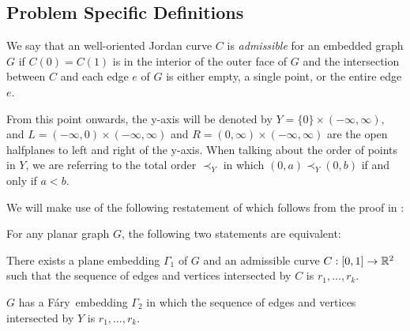 \documentclass{patmorin}
\newcommand{\Fary}{Fáry}
\begin{document}
\subsection{Problem Specific Definitions}

We say that an well-oriented Jordan curve $C$ is \emph{admissible} for an
embedded graph $G$ if $C(0)=C(1)$ is in the interior of the outer face
of $G$ and the intersection between $C$ and each edge $e$ of $G$ is
either empty, a single point, or the entire edge $e$.  

From this point onwards, the y-axis will be denoted by
$Y=\{0\}\times(-\infty,\infty)$, and $L=(-\infty,0)\times(-\infty,\infty)$
and $R=(0,\infty)\times(-\infty,\infty)$ are the open halfplanes to left
and right of the y-axis. When talking about the order of points in $Y$,
we are referring to the total order $\prec_Y$ in which $(0,a) \prec_Y (0,b)$
if and only if $a<b$.



We will make use of the following restatement of 
which follows from the proof in \cite{dalozzo.dujmovic.ea:drawing}:
\begin{thm}
   For any planar graph $G$, the following two statements are equivalent:
   \begin{compactenum}
     \item There exists a plane embedding $\Gamma_1$ of $G$ and an
        admissible curve $C:[0,1]\to\mathbb{R}^2$ such that the sequence of edges
        and vertices intersected by $C$ is $r_1,\ldots,r_k$.
      \item $G$ has a \Fary\ embedding $\Gamma_2$ in which the sequence
      of edges and vertices intersected by $Y$ is $r_1,\ldots,r_k$.
   \end{compactenum}
\end{thm}
\end{document}
